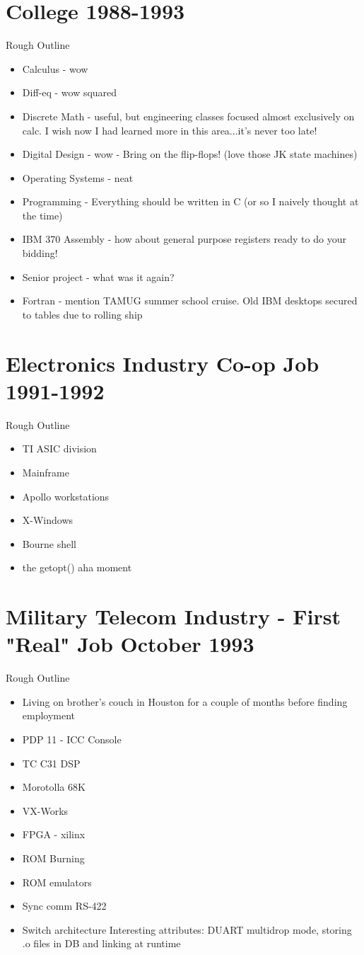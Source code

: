 \documentclass[12pt]{article}
\begin{document}
\section{College 1988-1993}
	Rough Outline
	\begin{itemize}
	\item Calculus - wow
	\item Diff-eq - wow squared
	\item Discrete Math - useful, but engineering classes focused almost exclusively on calc. I wish now I had 
	learned more in this area...it's never too late!
	\item Digital Design - wow - Bring on the flip-flops! (love those JK state machines)
	\item Operating Systems - neat
	\item Programming - Everything should be written in C (or so I naively thought at the time)
	\item IBM 370 Assembly - how about general purpose registers ready to do your bidding!
	\item Senior project - what was it again?
	\item Fortran - mention TAMUG summer school cruise. Old IBM desktops secured to tables due to rolling ship
	\end{itemize}

\section{Electronics Industry Co-op Job 1991-1992}
	Rough Outline
	\begin{itemize}
	\item TI ASIC division
	\item Mainframe
	\item Apollo workstations
	\item X-Windows
	\item Bourne shell
	\item the getopt() aha moment
	\end{itemize}
	
\section{Military Telecom Industry - First "Real" Job October 1993}
	Rough Outline
	\begin{itemize}
	\item Living on brother's couch in Houston for a couple of months before finding employment
	\item PDP 11 - ICC Console
	\item TC C31 DSP
	\item Morotolla 68K
	\item VX-Works
	\item FPGA - xilinx
	\item ROM Burning
	\item ROM emulators
	\item Sync comm RS-422
	\item Switch architecture Interesting attributes: DUART multidrop mode, storing .o files in DB and linking at runtime
	\end{itemize}
\end{document}
